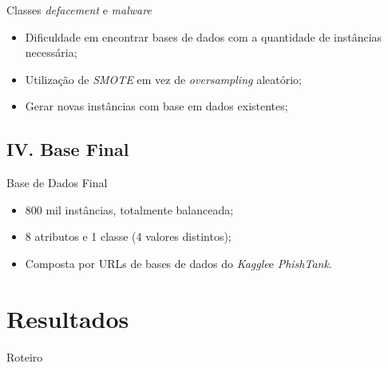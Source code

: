 \documentclass{beamer}
\begin{document}
\begin{frame}{Classes \emph{defacement} e \emph{malware}}

    \begin{itemize}
        \setlength{\itemsep}{10pt}
        \item Dificuldade em encontrar bases de dados com a quantidade de instâncias necessária;
        \item Utilização de \emph{SMOTE} \cite{DBLP:journals/corr/abs-1106-1813} em vez de \emph{oversampling} aleatório;
        \item Gerar novas instâncias com base em dados existentes;
    \end{itemize}

\end{frame}

\subsection{IV. Base Final}

\begin{frame}{Base de Dados Final}

    \begin{itemize}
        \setlength{\itemsep}{10pt}
        \item 800 mil instâncias, totalmente balanceada;
        \item 8 atributos e 1 classe (4 valores distintos);
        \item Composta por URLs de bases de dados do \emph{Kaggle}\footnotemark e \emph{PhishTank}.
    \end{itemize}

    
\end{frame}

\section{Resultados}

\begin{frame}{Roteiro} 
     \tableofcontents[currentsection]
\end{frame}
\end{document}
